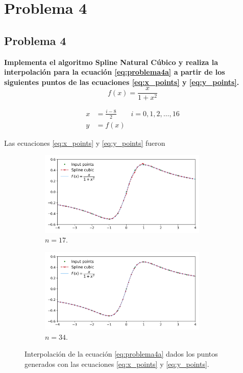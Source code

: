 \section{Problema 4}

\subsection*{Problema 4}

\textbf{Implementa el algoritmo Spline Natural Cúbico y realiza la interpolación para la ecuación \ref{eq:problema4a} a partir de los siguientes puntos de las ecuaciones \ref{eq:x_points} y \ref{eq:y_points}.}
\begin{equation}
	f(x) = \frac{x}{1+x^2} \label{eq:problema4a}
\end{equation}

\begin{align}
	x & = \frac{i-8}{2} \qquad i=0,1,2,\dots,16 \label{eq:x_points} \\
	y & = f(x) \label{eq:y_points}
\end{align}

Las ecuaciones \ref{eq:x_points} y \ref{eq:y_points} fueron


\begin{figure}[H]
	\centering
	\begin{subfigure}[b]{8cm}
		\includegraphics[width=8cm]{Graphics/problema04a_17.png}
		\caption{$n=17$.}
	\end{subfigure}
	\begin{subfigure}[b]{8cm}
		\includegraphics[width=8cm]{Graphics/problema04a_34.png}
		\caption{$n=34$.}
	\end{subfigure}
	\caption{Interpolación de la ecuación \ref{eq:problema4a} dados los puntos generados con las ecuaciones \ref{eq:x_points} y \ref{eq:y_points}.}
\end{figure}
